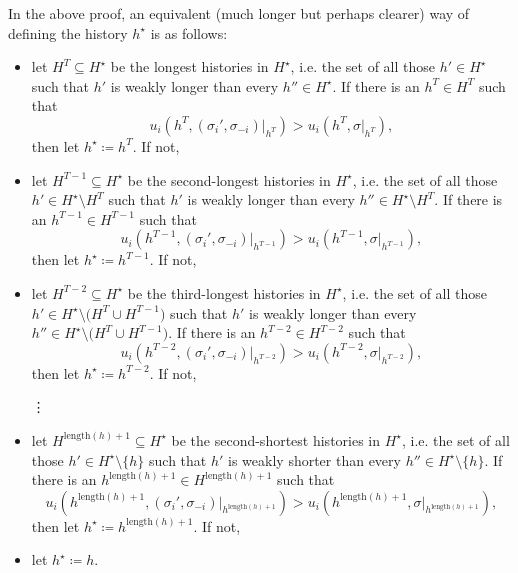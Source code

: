 \begin{remark}
	\label{remark:osdp_one_finite}
	In the above proof, an equivalent (much longer but perhaps clearer) way of defining the history $h^\star$ is as follows:

	\begin{itemize}
	
		\item let $H^T \subseteq H^\star$ be the longest histories in $H^\star$, i.e. the set of all those $h' \in H^\star$ such that $h'$ is weakly longer than every $h'' \in H^\star$. If there is an $h^T \in H^T$ such that
		\begin{equation*}
			u_i\left( h^T, (\sigma_i',\sigma_{-i})|_{h^T} \right)
			> u_i\left( h^T, \sigma|_{h^T} \right) ,
		\end{equation*}
		then let $h^\star \coloneqq h^T$. If not,

		\item let $H^{T-1} \subseteq H^\star$ be the second-longest histories in $H^\star$, i.e. the set of all those $h' \in H^\star \setminus H^T$ such that $h'$ is weakly longer than every $h'' \in H^\star \setminus H^T$. If there is an $h^{T-1} \in H^{T-1}$ such that
		\begin{equation*}
			u_i\left( h^{T-1}, (\sigma_i',\sigma_{-i})|_{h^{T-1}} \right)
			> u_i\left( h^{T-1}, \sigma|_{h^{T-1}} \right) ,
		\end{equation*}
		then let $h^\star \coloneqq h^{T-1}$. If not,

		\item let $H^{T-2} \subseteq H^\star$ be the third-longest histories in $H^\star$, i.e. the set of all those $h' \in H^\star \setminus \bigl( H^T \cup H^{T-1} \bigr)$ such that $h'$ is weakly longer than every $h'' \in H^\star \setminus \bigl( H^T \cup H^{T-1} \bigr)$. If there is an $h^{T-2} \in H^{T-2}$ such that
		\begin{equation*}
			u_i\left( h^{T-2}, (\sigma_i',\sigma_{-i})|_{h^{T-2}} \right)
			> u_i\left( h^{T-2}, \sigma|_{h^{T-2}} \right) ,
		\end{equation*}
		then let $h^\star \coloneqq h^{T-2}$. If not,

		\item[\vdots]

		\item let $H^{\text{length}(h)+1} \subseteq H^\star$ be the second-shortest histories in $H^\star$, i.e. the set of all those $h' \in H^\star \setminus \{h\}$ such that $h'$ is weakly shorter than every $h'' \in H^\star \setminus \{h\}$. If there is an $h^{\text{length}(h)+1} \in H^{\text{length}(h)+1}$ such that
		\begin{equation*}
			u_i\left( h^{\text{length}(h)+1}, (\sigma_i',\sigma_{-i})|_{h^{\text{length}(h)+1}} \right)
			> u_i\left( h^{\text{length}(h)+1}, \sigma|_{h^{\text{length}(h)+1}} \right) ,
		\end{equation*}
		then let $h^\star \coloneqq h^{\text{length}(h)+1}$. If not,

		\item let $h^\star \coloneqq h$.

	\end{itemize}
\end{remark}

